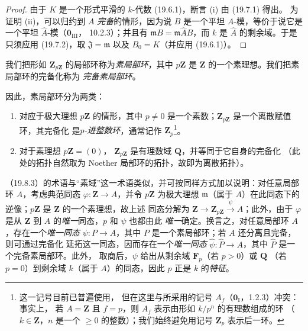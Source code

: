 \begin{proof}
由于 $K$ 是一个形式平滑的 $k$-代数 (19.6.1)，断言 (i) 由 (19.7.1) 得出。
为证明 (ii)，可以归约到 $A$ \emph{完备}的情形，因为说 $B$ 是一个平坦
$A$-模，等价于说它是一个平坦 $\widehat A$-模（$\mathbf 0_{\mathrm{III}}$，
10.2.3）；并且有 $\mathfrak mB=\mathfrak m\widehat AB$，而 $k$ 是
$\widehat A$ 的剩余域。于是只须应用 (19.7.2)，取 $\mathfrak J=\mathfrak m$
以及 $B_0=K$（并应用 (19.6.1)）。
\end{proof}

\begin{definition}[19.8.3]
\label{0.19.8.3-fr}
我们把形如 $\mathbf Z_{p\mathbf Z}$ 的局部环称为\emph{素局部环}，其中
$p\mathbf Z$ 是 $\mathbf Z$ 的一个素理想。我们把素局部环的完备化称为
\emph{完备素局部环}。
\end{definition}

因此，素局部环分为两类：
\begin{enumerate}
  \item[$1^{\mathrm o}$] 对应于极大理想 $p\mathbf Z$ 的情形，其中
  $p\neq0$ 是一个素数；$\mathbf Z_{p\mathbf Z}$ 是一个离散赋值环，其完备化
  是\emph{$p$-进整数环}，通常记作 $\mathbf Z_p$\footnote{这一记号目前已普遍使用，
  但在这里与所采用的记号 $A_f$（$\mathbf 0_{\mathrm I}$，1.2.3）冲突：事实上，
  若 $A=\mathbf Z$ 且 $f=p$，则 $A_f$ 表示由形如 $k/p^n$ 的有理数组成的环
  （$k\in\mathbf Z$，$n$ 是一个 $\geq0$ 的整数）；我们始终避免用记号
  $\mathbf Z_p$ 表示后一环。}。
  \item[$2^{\mathrm o}$] 对于素理想 $p\mathbf Z=(0)$，
  $\mathbf Z_{p\mathbf Z}$ 是有理数域 $\mathbf Q$，并等同于它自身的完备化
  （此处的拓扑自然取为 Noether 局部环的拓扑，故即为离散拓扑）。
\end{enumerate}

（19.8.3）的术语与“素域”这一术语类似，并可按同样方式加以说明：对任意局部环
$A$，考虑典范同态 $\varphi:\mathbf Z\to A$，并令 $p\mathbf Z$ 为极大理想
$\mathfrak m$（属于 $A$）在此同态下的逆像；$p\mathbf Z$ 是 $\mathbf Z$ 的一个素理想，故上述
同态分解为
$\mathbf Z\to\mathbf Z_{p\mathbf Z}\xrightarrow{\psi}A$；此外，由于
$\varphi$ 是从 $\mathbf Z$ 到 $A$ 的\emph{唯一}同态，$p$ 和 $\psi$ 也都由此
\emph{唯一}确定。换言之，对任意局部环 $A$，存在一个\emph{唯一同态}
$\psi:P\to A$，其中 $P$ 是一个素局部环；若 $A$ 还分离且完备，则可通过完备化
延拓这一同态，因而存在一个\emph{唯一同态}
$\widehat\psi:\widehat P\to A$，其中 $\widehat P$ 是一个完备素局部环。此外，
取商后，$\psi$ 给出从剩余域 $\mathbf F_p$（若 $p>0$）或 $\mathbf Q$
（若 $p=0$）到剩余域 $k$（属于 $A$）的同态，因此 $p$ 正是 $k$ 的\emph{特征}。

